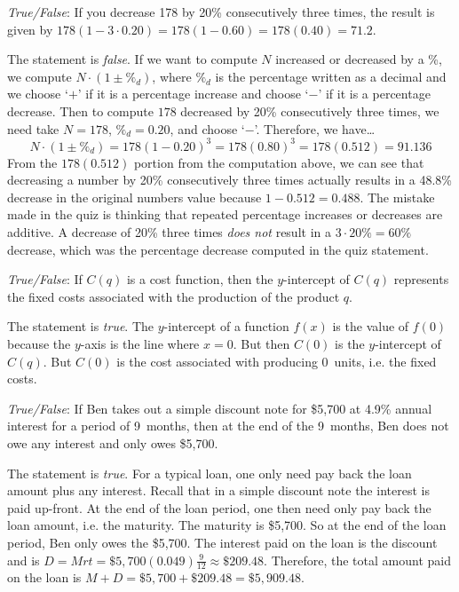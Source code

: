 \documentclass[11pt,letterpaper]{article}
\begin{document}
\thispagestyle{title}

\quizsol \textit{True/False}: If you decrease 178 by 20\% consecutively three times, the result is given by $178 (1 - 3 \cdot 0.20)= 178(1 - 0.60)= 178(0.40)= 71.2$.  \pspace

\sol The statement is \textit{false}. If we want to compute $N$ increased or decreased by a \%, we compute $N \cdot (1 \pm \%_d)$, where $\%_d$ is the percentage written as a decimal and we choose `$+$' if it is a percentage increase and choose `$-$' if it is a percentage decrease. Then to compute $178$ decreased by 20\% consecutively three times, we need take $N= 178$, $\%_d= 0.20$, and choose `$-$'. Therefore, we have\dots
	\[
	N \cdot (1 \pm \%_d)= 178 (1 - 0.20)^3= 178(0.80)^3= 178(0.512)= 91.136
	\]
From the $178(0.512)$ portion from the computation above, we can see that decreasing a number by 20\% consecutively three times actually results in a 48.8\% decrease in the original numbers value because $1 - 0.512= 0.488$. The mistake made in the quiz is thinking that repeated percentage increases or decreases are additive. A decrease of 20\% three times \textit{does not} result in a $3 \cdot 20\%= 60\%$ decrease, which was the percentage decrease computed in the quiz statement. \pvspace{1.3cm}



\quizsol \textit{True/False}: If $C(q)$ is a cost function, then the $y$-intercept of $C(q)$ represents the fixed costs associated with the production of the product $q$. \pspace

\sol The statement is \textit{true}. The $y$-intercept of a function $f(x)$ is the value of $f(0)$ because the $y$-axis is the line where $x= 0$. But then $C(0)$ is the $y$-intercept of $C(q)$. But $C(0)$ is the cost associated with producing $0$~units, i.e. the fixed costs. \pvspace{1.3cm}



\quizsol \textit{True/False}: If Ben takes out a simple discount note for \$5,700 at 4.9\% annual interest for a period of 9~months, then at the end of the 9~months, Ben does not owe any interest and only owes \$5,700. \pspace

\sol The statement is \textit{true}. For a typical loan, one only need pay back the loan amount plus any interest. Recall that in a simple discount note the interest is paid up-front. At the end of the loan period, one then need only pay back the loan amount, i.e. the maturity. The maturity is \$5,700. So at the end of the loan period, Ben only owes the \$5,700. The interest paid on the loan is the discount and is $D= Mrt= \$5,\!700(0.049) \frac{9}{12} \approx \$209.48$. Therefore, the total amount paid on the loan is $M + D= \$5,\!700 + \$209.48= \$5,\!909.48$. \pvspace{1.3cm}
\end{document}
